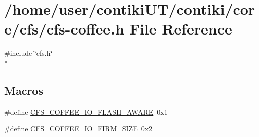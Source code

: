 \hypertarget{cfs-coffee_8h}{}\section{/home/user/contiki\+U\+T/contiki/core/cfs/cfs-\/coffee.h File Reference}
\label{cfs-coffee_8h}
{\ttfamily \#include \char`\"{}cfs.\+h\char`\"{}}\\*
\subsection*{Macros}
\begin{DoxyCompactItemize}
\item 
\#define \hyperlink{group__cfs_ga3ba46c00491d80f860a9e531403a0a63}{C\+F\+S\+\_\+\+C\+O\+F\+F\+E\+E\+\_\+\+I\+O\+\_\+\+F\+L\+A\+S\+H\+\_\+\+A\+W\+A\+R\+E}~0x1
\item 
\#define \hyperlink{group__cfs_ga6f4139866092ae209517c8b9e8c740c1}{C\+F\+S\+\_\+\+C\+O\+F\+F\+E\+E\+\_\+\+I\+O\+\_\+\+F\+I\+R\+M\+\_\+\+S\+I\+Z\+E}~0x2
\end{DoxyCompactItemize}
